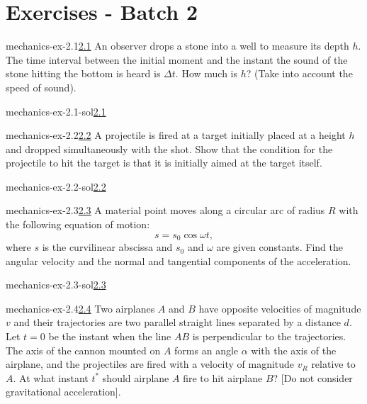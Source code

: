 \documentclass[preview]{standalone}
\begin{document}
\genpage

\section{Exercises - Batch 2}

\begin{snippetexercise}{mechanics-ex-2.1}{\underline{2.1}}
    An observer drops a stone into a well to measure its depth \(h\).
    The time interval between the initial moment and the instant the sound of the stone hitting the bottom
    is heard is \(\Delta t\). How much is \(h\)? (Take into account the speed of sound).
\end{snippetexercise}

\begin{snippetsolution}{mechanics-ex-2.1-sol}{\underline{2.1}}
    \todo
\end{snippetsolution}

\begin{snippetexercise}{mechanics-ex-2.2}{\underline{2.2}}
    A projectile is fired at a target initially placed at a height \(h\) and dropped simultaneously with the shot.
    Show that the condition for the projectile to hit the target is that it is initially aimed at the target itself.
\end{snippetexercise}

\begin{snippetsolution}{mechanics-ex-2.2-sol}{\underline{2.2}}
    \todo
\end{snippetsolution}

\begin{snippetexercise}{mechanics-ex-2.3}{\underline{2.3}}
    A material point moves along a circular arc of radius \(R\) with the following equation of motion:
    \[
        s = s_0 \cos \omega t,
    \]
    where \(s\) is the curvilinear abscissa and \(s_0\) and \(\omega\) are given constants.
    Find the angular velocity and the normal and tangential components of the acceleration.
\end{snippetexercise}

\begin{snippetsolution}{mechanics-ex-2.3-sol}{\underline{2.3}}
    \todo
\end{snippetsolution}

\begin{snippetexercise}{mechanics-ex-2.4}{\underline{2.4}}
    Two airplanes \(A\) and \(B\) have opposite velocities of magnitude \(v\) and their trajectories are two
    parallel straight lines separated by a distance \(d\).
    Let \(t=0\) be the instant when the line \(AB\) is perpendicular to the trajectories.
    The axis of the cannon mounted on \(A\) forms an angle \(\alpha\) with the axis of the airplane,
    and the projectiles are fired with a velocity of magnitude \(v_R\) relative to \(A\).
    At what instant \(t^*\) should airplane \(A\) fire to hit airplane \(B\)?
    [Do not consider gravitational acceleration].
\end{snippetexercise}
\end{document}
